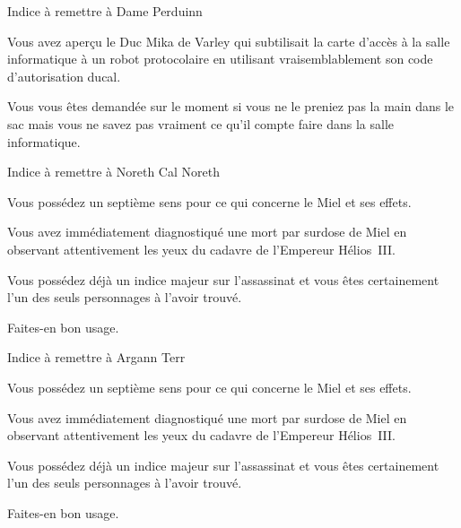 \documentclass{article}
\begin{document}
\begin{samepage}
    Indice à remettre à Dame Perduinn

    \nobreak

    \begin{framed}
        Vous avez aperçu le Duc Mika de Varley qui subtilisait la
        carte d'accès à la salle informatique à un robot protocolaire en
        utilisant vraisemblablement son code d'autorisation ducal.

        \nobreak

        Vous vous êtes demandée sur le moment si vous ne le preniez pas la main
        dans le sac mais vous ne savez pas vraiment ce qu'il compte
        faire dans la salle informatique.
    \end{framed}
\end{samepage}

\begin{samepage}
    Indice à remettre à Noreth Cal Noreth

    \nobreak

    \begin{framed}
        Vous possédez un septième sens pour ce qui concerne le Miel et ses
        effets.

        \nobreak

        Vous avez immédiatement diagnostiqué une mort par surdose de Miel en
        observant attentivement les yeux du cadavre de l'Empereur Hélios~III.

        \nobreak

        Vous possédez déjà un indice majeur sur l'assassinat et vous êtes
        certainement l'un des seuls personnages à l'avoir trouvé.

        \nobreak

        Faites-en bon usage.
    \end{framed}
\end{samepage}

\begin{samepage}
    Indice à remettre à Argann Terr

    \nobreak

    \begin{framed}
        Vous possédez un septième sens pour ce qui concerne le Miel et ses
        effets.

        \nobreak

        Vous avez immédiatement diagnostiqué une mort par surdose de Miel en
        observant attentivement les yeux du cadavre de l'Empereur Hélios~III.

        \nobreak

        Vous possédez déjà un indice majeur sur l'assassinat et vous êtes
        certainement l'un des seuls personnages à l'avoir trouvé.

        \nobreak

        Faites-en bon usage.
    \end{framed}
\end{samepage}
\end{document}
